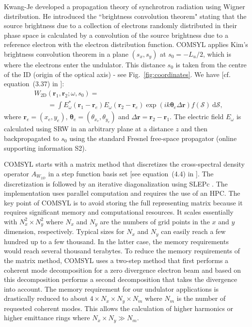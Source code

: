 \documentclass{iucr}
\newcommand{\inblue}[1]{{\color{blue}#1}}
\begin{document}
Kwang-Je  developed a propagation theory of synchrotron radiation using Wigner distribution. He introduced the ``brightness convolution theorem" stating that the source brightness due to a collection of electrons randomly distributed in their phase space is calculated by a convolution of the source brightness due to a reference electron with the electron distribution function. 
COMSYL applies Kim's brightness convolution theorem in a plane $(s_x,s_y)$ at $s_0=-L_u\big/2$, which is where the electrons enter the undulator. This distance $s_0$ is taken from the centre of the ID (origin of the optical axis) - see \inblue{Fig.~\ref{fig:coordinates}}. We have [cf. equation~(3.37) in \cite{glassThesis}]:
\begin{equation}\label{eq:comsyl_W2D}
\begin{split}
& W_\text{2D}(\textbf{r}_1,\textbf{r}_2;\omega,s_0) = \\
&\qquad=\int E_\omega^*(\textbf{r}_1-\textbf{r}_e)
    E_\omega(\textbf{r}_2-\textbf{r}_e) \exp(i k \mathbf{\theta}_e\Delta\textbf{r})f(\mathcal{S})~\text{d}\mathcal{S},
\end{split}
\end{equation}
where $\textbf{r}_e=(x_e,y_e)$, $\mathbf{\theta}_e=(\theta_{x_e},\theta_{y_e})$ and $\Delta\textbf{r}=\textbf{r}_2-\textbf{r}_1$. The electric field $E_\omega$ is calculated using SRW in an arbitrary plane at a distance $z$ and then backpropagated to $s_0$ using the standard Fresnel free-space propagator (online supporting information S2).

COMSYL starts with a matrix method that discretizes the cross-spectral density operator $A_{W_{2D}}$ in a step function basis set [see equation~(4.4) in \cite{glassThesis}]. The discretization is followed by an iterative diagonalization using SLEPc \cite{SLEPc}. The implementation uses parallel computation and requires the use of an HPC. The key point of COMSYL is to avoid storing the full representing matrix because it requires significant memory and computational resources. It scales essentially with $N_x^2 \times N_y^2$ where $N_x$ and $N_y$ are the numbers of grid points in the $x$ and $y$ dimension, respectively. Typical sizes for $N_x$ and $N_y$ can easily reach a few hundred up to a few thousand. In the latter case, the memory requirements would reach several thousand terabytes. To reduce the memory requirements of the matrix method, COMSYL uses a two-step method that first performs a coherent mode decomposition for a zero divergence electron beam and based on this decomposition performs a second decomposition that takes the divergence into account. The memory requirement for our undulator applications is drastically reduced to about $4 \times N_x \times N_y \times N_m$ where $N_m$ is the number of requested coherent modes. This allows the calculation of higher harmonics or higher emittance rings where $N_x \times N_y \gg N_m$. 
\end{document}
